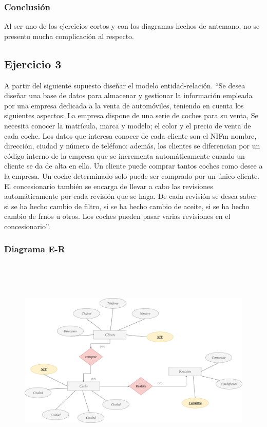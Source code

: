 \documentclass[a4paper, 12pt]{article}
\begin{document}
\begin{justify}
        \subsubsection{Conclusión}
        \justify
        Al ser uno de los ejercicios cortos y con los diagramas hechos de antemano, no se presento mucha complicación al respecto.
        \subsection{Ejercicio 3}
        \justify
        A partir del siguiente supuesto diseñar el modelo entidad-relación. ``Se desea diseñar una base de datos para almacenar y gestionar la información
        empleada por una empresa dedicada a la venta de automóviles, teniendo en cuenta los siguientes aspectos: La empresa dispone de una serie de coches para
        su venta, Se necesita conocer la matrícula, marca y modelo; el color y el precio de venta de cada coche. Los datos que interesa conocer de cada cliente
        son el NIFm nombre, dirección, ciudad y número de teléfono: además, los clientes se diferencian por un código interno de la empresa que se incrementa
        automáticamente cuando un cliente se da de alta en ella. Un cliente puede comprar tantos coches como desee a la empresa. Un coche determinado solo puede ser comprado
        por un único cliente. El concesionario también se encarga de llevar a cabo las revisiones automáticamente por cada revisión que se haga. De cada revisión se desea saber
        si se ha hecho cambio de filtro, si se ha hecho cambio de aceite, si se ha hecho cambio de frnos u otros. Los coches pueden pasar varias revisiones en el concesionario''.
        \subsubsection{Diagrama E-R}
        \begin{figure}[H]
            \centering
            \includegraphics[width=16cm,height=10cm]{er3.png}
        \end{figure}

\end{justify}
\end{document}
